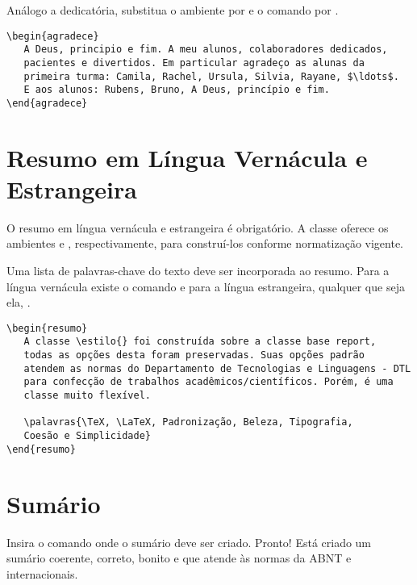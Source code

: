 Análogo a dedicatória, substitua o ambiente  por
 e o comando  por .
\begin{tcolorbox}
\begin{lstlisting}
\begin{agradece}
   A Deus, principio e fim. A meu alunos, colaboradores dedicados,
   pacientes e divertidos. Em particular agradeço as alunas da
   primeira turma: Camila, Rachel, Ursula, Silvia, Rayane, $\ldots$.
   E aos alunos: Rubens, Bruno, A Deus, princípio e fim.
\end{agradece}
\end{lstlisting}
\end{tcolorbox}

\section{Resumo em Língua Vernácula e Estrangeira}\label{resumo}
O resumo em língua vernácula e estrangeira é obrigatório.
A classe \estilo{} oferece os ambientes  e
, respectivamente, para construí-los conforme
normatização vigente.

Uma lista de palavras-chave do texto deve ser incorporada ao resumo.
Para a língua vernácula existe o comando  e para
a língua estrangeira, qualquer que seja ela, .
\begin{tcolorbox}
\begin{lstlisting}
\begin{resumo}
   A classe \estilo{} foi construída sobre a classe base report,
   todas as opções desta foram preservadas. Suas opções padrão
   atendem as normas do Departamento de Tecnologias e Linguagens - DTL
   para confecção de trabalhos acadêmicos/científicos. Porém, é uma
   classe muito flexível.

   \palavras{\TeX, \LaTeX, Padronização, Beleza, Tipografia,
   Coesão e Simplicidade}
\end{resumo}
\end{lstlisting}
\end{tcolorbox}

\section{Sumário}

Insira o comando  onde o sumário
deve ser criado. Pronto! Está criado um sumário coerente, correto,
bonito e que atende às normas da ABNT e internacionais.

